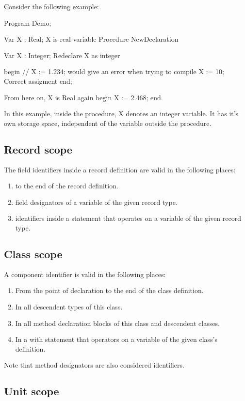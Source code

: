 \documentclass{report}
\begin{document}
Consider the following example:
\begin{listing}
Program Demo;

Var X : Real;
{ X is real variable }
Procedure NewDeclaration

Var X : Integer;  { Redeclare X as integer}

begin
 // X := 1.234; {would give an error when trying to compile}
 X := 10; { Correct assigment}
end;

{ From here on, X is Real again}
begin
 X := 2.468;
end.
\end{listing}
In this example, inside the procedure, X denotes an integer variable.
It has it's own storage space, independent of the variable  outside
the procedure.

\subsection{Record scope}

The field identifiers inside a record definition are valid in the following
places:
\begin{enumerate}
\item to the end of the record definition.
\item field designators of a variable of the given record type.
\item identifiers inside a  statement that operates on a variable
of the given record type.
\end{enumerate}

\subsection{Class scope}
A component identifier is valid in the following places:
\begin{enumerate}
\item From the point of declaration to the end of the class definition.
\item In all descendent types of this class.
\item In all method declaration blocks of this class and descendent classes.
\item In a with statement that operators on a variable of the given class's
definition.
\end{enumerate}

Note that method designators are also considered identifiers.

\subsection{Unit scope}
\end{document}
